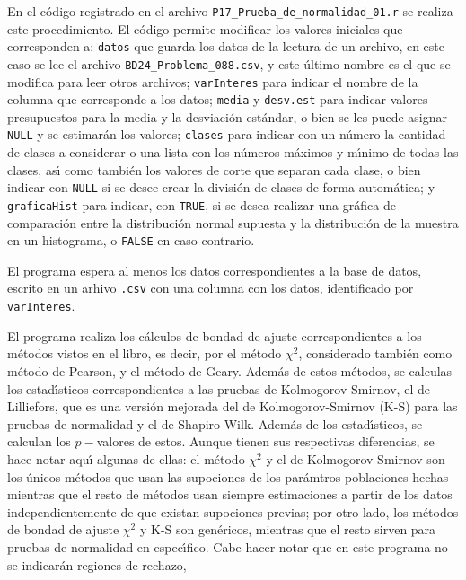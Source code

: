 \begin{solucion}
 En el c\'odigo registrado en el archivo
 \texttt{P17\_Prueba\_de\_normalidad\_01.r} se realiza este procedimiento.
 El c\'odigo permite modificar los valores iniciales que corresponden a:
 \texttt{datos} que guarda los datos de la lectura de un archivo,
 en este caso se lee el archivo \texttt{BD24\_Problema\_088.csv},
 y este \'ultimo nombre es el que se modifica para leer otros archivos;
 \texttt{varInteres} para indicar el nombre de la columna
 que corresponde a los datos;
 \texttt{media} y \texttt{desv.est} para indicar valores presupuestos
 para la media y la desviaci\'on est\'andar,
 o bien se les puede asignar \texttt{NULL} y se
 estimar\'an los valores;
 \texttt{clases} para indicar con un n\'umero la cantidad de clases
 a considerar o una lista con los n\'umeros m\'aximos y m\'{\i}nimo
 de todas las clases, as\'{\i} como tambi\'en los valores de corte
 que separan cada clase,
 o bien indicar con \texttt{NULL} si se desee crear la divisi\'on de clases
 de forma autom\'atica;
 y \texttt{graficaHist} para indicar, con \texttt{TRUE},
 si se desea realizar una gr\'afica de comparaci\'on entre la distribuci\'on
 normal supuesta y la distribuci\'on de la muestra en un histograma,
 o \texttt{FALSE} en caso contrario.
 \par
 El programa espera al menos los datos correspondientes a la base de datos,
 escrito en un arhivo \texttt{.csv} con una columna con los datos, 
 identificado por \texttt{varInteres}.
 \par
 El programa realiza los c\'alculos de bondad de ajuste correspondientes
 a los m\'etodos vistos en el libro, es decir, por el m\'etodo $\chi^2$,
 considerado tambi\'en como m\'etodo de Pearson,
 y el m\'etodo de Geary.
 Adem\'as de estos m\'etodos, se calculas los estad\'{\i}sticos
 correspondientes a las pruebas de Kolmogorov-Smirnov, el de Lilliefors,
 que es una versi\'on mejorada del de Kolmogorov-Smirnov (K-S)
 para las pruebas de normalidad y el de Shapiro-Wilk.
 Adem\'as de los estad\'{\i}sticos, se calculan los $p-$valores de estos.
 Aunque tienen sus respectivas diferencias, se hace notar aqu\'{\i}
 algunas de ellas:
 el m\'etodo $\chi^2$ y el de Kolmogorov-Smirnov son los \'unicos
 m\'etodos que usan las supociones de los par\'amtros poblaciones hechas mientras que el resto de m\'etodos usan siempre estimaciones
 a partir de los datos independientemente de que existan supociones previas;
 por otro lado, los m\'etodos de bondad de ajuste $\chi^2$ y K-S
 son gen\'ericos, mientras que el resto sirven para pruebas de normalidad
 en espec\'{\i}fico.
 Cabe hacer notar que en este programa no se indicar\'an regiones de rechazo, 

\end{solucion}
